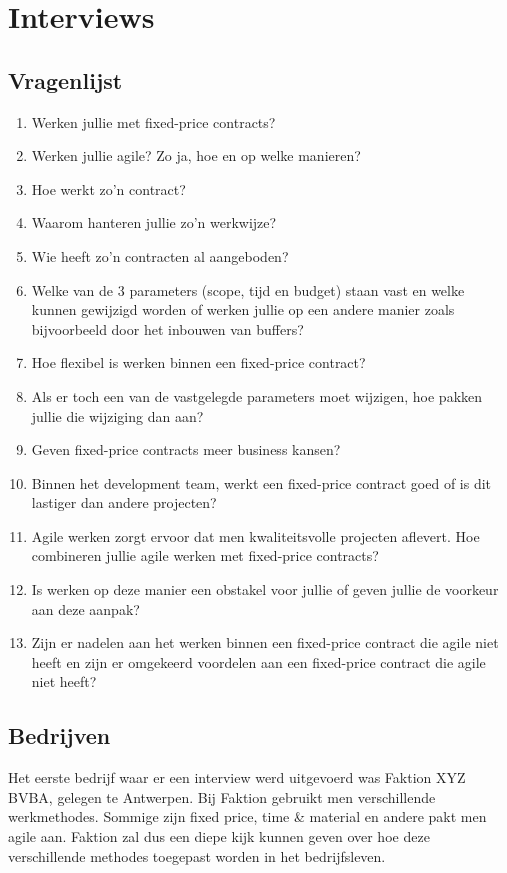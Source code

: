 \documentclass{hogent-article}
\begin{document}
	
	\section{Interviews}
	\subsection{Vragenlijst}
	\label{vragen}
	\begin{enumerate}
		\item Werken jullie met fixed-price contracts?
		\item Werken jullie agile? Zo ja, hoe en op welke manieren?
		\item Hoe werkt zo'n contract?
		\item Waarom hanteren jullie zo’n werkwijze?
		\item Wie heeft zo'n contracten al aangeboden?
		\item Welke van de 3 parameters (scope, tijd en budget) staan vast en welke kunnen gewijzigd worden of werken jullie op een andere manier zoals bijvoorbeeld door het inbouwen van buffers?
		\item Hoe flexibel is werken binnen een fixed-price contract?
		\item Als er toch een van de vastgelegde parameters moet wijzigen, hoe pakken jullie die wijziging dan aan?
		\item Geven fixed-price contracts meer business kansen?
		\item Binnen het development team, werkt een fixed-price contract goed of is dit lastiger dan andere projecten?
		\item Agile werken zorgt ervoor dat men kwaliteitsvolle projecten aflevert. Hoe combineren jullie agile werken met fixed-price contracts?
		\item Is werken op deze manier een obstakel voor jullie of geven jullie de voorkeur aan deze aanpak?
		\item Zijn er nadelen aan het werken binnen een fixed-price contract die agile niet heeft en zijn er omgekeerd voordelen aan een fixed-price contract die agile niet heeft?
	\end{enumerate}
		
    \subsection{Bedrijven}
    Het eerste bedrijf waar er een interview werd uitgevoerd was Faktion XYZ BVBA, gelegen te Antwerpen. Bij Faktion gebruikt men verschillende werkmethodes. Sommige zijn fixed price, time \& material en andere pakt men agile aan. Faktion zal dus een diepe kijk kunnen geven over hoe deze verschillende methodes toegepast worden in het bedrijfsleven.
    
\end{document}
